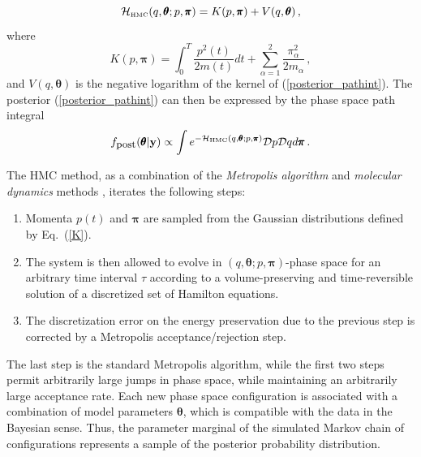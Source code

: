 \documentclass[11pt]{article}
\newcommand{\vc}[1]{{\bf #1 }}
\theoremstyle{definition}
\newcommand{\bt}{\pmb\theta}
\begin{document}
\begin{equation}\label{Hamiltonian}
    \mathcal{H}_{\mbox{\tiny HMC}}(q,\bt; p,{\pmb\pi})
    =
    K( p,{\pmb\pi}) + V( q,\bt)\,,
\end{equation}
where
\begin{equation}\label{K}
   K( p,{\pmb\pi})
   =
   \int_0^T \frac{ p^2(t)}{2m(t)}dt
   + \sum_{\alpha=1}^2\frac{\pi_\alpha^2}{2m_\alpha}\,,
\end{equation}
and $V( q,\bt)$ is the negative logarithm of the kernel of (\ref{posterior_pathint}).
The posterior (\ref{posterior_pathint}) can then
be expressed by the phase space path integral
\begin{equation}\label{phaseSpacePathInt}
    f_{\mbox{\small post}}(\bt | \vc y)
  \propto
  \int
  e^{-\mathcal {H}_{\mbox{\tiny HMC}}(q,\bt; p,{\pmb\pi})}
  {\mathcal Dp}
   {\mathcal Dq}
   d{\pmb\pi}
  \,.
\end{equation}


The HMC method, as a combination of the {\em Metropolis algorithm} \cite{metropolis_1953} and {\em molecular dynamics} methods \cite{alder_1959_MD, rahman_1964_MD}, iterates the following steps:
\begin{enumerate}
  \item
  Momenta $p(t)$ and ${\pmb\pi}$ are sampled from the Gaussian distributions defined by Eq.~(\ref{K}).
  \item
  The system is then allowed to evolve in $\left(q,\bt; p,{\pmb\pi}\right)$-phase space for an arbitrary time interval $\tau$ according to a volume-preserving and time-reversible solution of a discretized set of Hamilton equations.
  \item
  The discretization error on the energy preservation due to the previous step is corrected by a Metropolis acceptance/rejection step.
\end{enumerate}
The last step is the standard Metropolis algorithm, while the first two steps permit arbitrarily large jumps in phase space, while maintaining an arbitrarily large acceptance rate. Each new phase space configuration is associated with a combination of model parameters $\bt$, which is compatible with the data in the Bayesian sense. Thus, the parameter marginal of the simulated Markov chain of configurations represents a sample of the posterior probability distribution.
\end{document}
